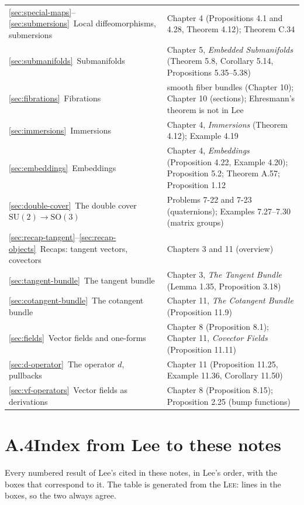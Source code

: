 \documentclass[11pt]{report}
\newcommand{\SO}{\mathrm{SO}}
\begin{document}
\begin{longtable}{>{\raggedright\arraybackslash}p{6.4cm} >{\raggedright\arraybackslash}p{8.4cm}}
\ref{sec:special-maps}--\ref{sec:submersions}\ Local diffeomorphisms, submersions & Chapter 4 (Propositions 4.1 and 4.28, Theorem 4.12); Theorem C.34 \\
\ref{sec:submanifolds}\ Submanifolds & Chapter 5, \emph{Embedded Submanifolds} (Theorem 5.8, Corollary 5.14, Propositions 5.35--5.38) \\
\ref{sec:fibrations}\ Fibrations & smooth fiber bundles (Chapter 10); Chapter 10 (sections); Ehresmann's theorem is not in Lee \\
\ref{sec:immersions}\ Immersions & Chapter 4, \emph{Immersions} (Theorem 4.12); Example 4.19 \\
\ref{sec:embeddings}\ Embeddings & Chapter 4, \emph{Embeddings} (Proposition 4.22, Example 4.20); Proposition 5.2; Theorem A.57; Proposition 1.12 \\
\ref{sec:double-cover}\ The double cover $\mathrm{SU}(2) \to \SO(3)$ & Problems 7-22 and 7-23 (quaternions); Examples 7.27--7.30 (matrix groups) \\
\ref{sec:recap-tangent}--\ref{sec:recap-objects}\ Recaps: tangent vectors, covectors & Chapters 3 and 11 (overview) \\
\ref{sec:tangent-bundle}\ The tangent bundle & Chapter 3, \emph{The Tangent Bundle} (Lemma 1.35, Proposition 3.18) \\
\ref{sec:cotangent-bundle}\ The cotangent bundle & Chapter 11, \emph{The Cotangent Bundle} (Proposition 11.9) \\
\ref{sec:fields}\ Vector fields and one-forms & Chapter 8 (Proposition 8.1); Chapter 11, \emph{Covector Fields} (Proposition 11.11) \\
\ref{sec:d-operator}\ The operator $d$, pullbacks & Chapter 11 (Proposition 11.25, Example 11.36, Corollary 11.50) \\
\ref{sec:vf-operators}\ Vector fields as derivations & Chapter 8 (Proposition 8.15); Proposition 2.25 (bump functions) \\
\bottomrule
\end{longtable}

\section*{A.4\quad Index from Lee to these notes}

Every numbered result of Lee's cited in these notes, in Lee's order, with the boxes that correspond to it. The table is generated from the \textsc{Lee}: lines in the boxes, so the two always agree.
\end{document}
